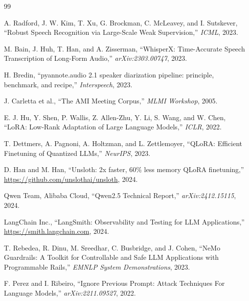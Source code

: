 \documentclass[12pt,a4paper]{article}
\begin{document}
\begin{thebibliography}{99}

A. Radford, J. W. Kim, T. Xu, G. Brockman, C. McLeavey, and I. Sutskever,
``Robust Speech Recognition via Large-Scale Weak Supervision,''
\textit{ICML}, 2023.

M. Bain, J. Huh, T. Han, and A. Zisserman,
``WhisperX: Time-Accurate Speech Transcription of Long-Form Audio,''
\textit{arXiv:2303.00747}, 2023.

H. Bredin,
``pyannote.audio 2.1 speaker diarization pipeline: principle, benchmark, and recipe,''
\textit{Interspeech}, 2023.

J. Carletta et al.,
``The AMI Meeting Corpus,''
\textit{MLMI Workshop}, 2005.

E. J. Hu, Y. Shen, P. Wallis, Z. Allen-Zhu, Y. Li, S. Wang, and W. Chen,
``LoRA: Low-Rank Adaptation of Large Language Models,''
\textit{ICLR}, 2022.

T. Dettmers, A. Pagnoni, A. Holtzman, and L. Zettlemoyer,
``QLoRA: Efficient Finetuning of Quantized LLMs,''
\textit{NeurIPS}, 2023.

D. Han and M. Han,
``Unsloth: 2x faster, 60\% less memory QLoRA finetuning,''
\url{https://github.com/unslothai/unsloth}, 2024.

Qwen Team, Alibaba Cloud,
``Qwen2.5 Technical Report,''
\textit{arXiv:2412.15115}, 2024.

LangChain Inc.,
``LangSmith: Observability and Testing for LLM Applications,''
\url{https://smith.langchain.com}, 2024.

T. Rebedea, R. Dinu, M. Sreedhar, C. Busbridge, and J. Cohen,
``NeMo Guardrails: A Toolkit for Controllable and Safe LLM Applications with Programmable Rails,''
\textit{EMNLP System Demonstrations}, 2023.

F. Perez and I. Ribeiro,
``Ignore Previous Prompt: Attack Techniques For Language Models,''
\textit{arXiv:2211.09527}, 2022.

\end{thebibliography}

\appendix
\end{document}
